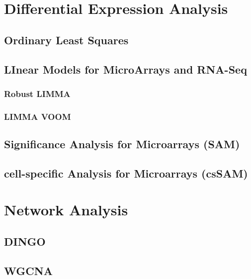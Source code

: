 \documentclass[]{book}
\begin{document}
\chapter{Differential Expression Analysis}\label{diff-exp}

\section{Ordinary Least Squares}\label{ordinary-least-squares}

\section{LInear Models for MicroArrays and
RNA-Seq}\label{linear-models-for-microarrays-and-rna-seq}

\subsection{Robust LIMMA}\label{robust-limma}

\subsection{LIMMA VOOM}\label{limma-voom}

\section{Significance Analysis for Microarrays
(SAM)}\label{significance-analysis-for-microarrays-sam}

\section{cell-specific Analysis for Microarrays
(csSAM)}\label{cell-specific-analysis-for-microarrays-cssam}

\chapter{Network Analysis}\label{network-analysis}

\section{DINGO}\label{dingo}

\section{WGCNA}\label{wgcna}
\end{document}
